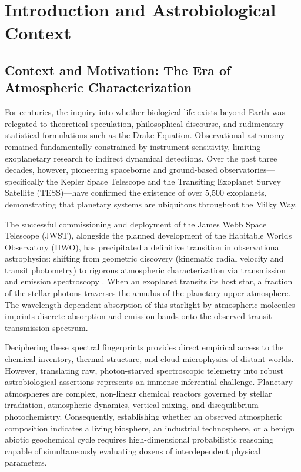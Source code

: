 \chapter{Introduction and Astrobiological Context}\label{chap:introduction}

\section{Context and Motivation: The Era of Atmospheric Characterization}\label{sec:context_motivation}

For centuries, the inquiry into whether biological life exists beyond Earth was relegated to theoretical speculation, philosophical discourse, and rudimentary statistical formulations such as the Drake Equation. Observational astronomy remained fundamentally constrained by instrument sensitivity, limiting exoplanetary research to indirect dynamical detections. Over the past three decades, however, pioneering spaceborne and ground-based observatories---specifically the Kepler Space Telescope and the Transiting Exoplanet Survey Satellite (TESS)---have confirmed the existence of over 5,500 exoplanets, demonstrating that planetary systems are ubiquitous throughout the Milky Way.

The successful commissioning and deployment of the James Webb Space Telescope (JWST), alongside the planned development of the Habitable Worlds Observatory (HWO), has precipitated a definitive transition in observational astrophysics: shifting from geometric discovery (kinematic radial velocity and transit photometry) to rigorous atmospheric characterization via transmission and emission spectroscopy \cite{madhusudhan2023}. When an exoplanet transits its host star, a fraction of the stellar photons traverses the annulus of the planetary upper atmosphere. The wavelength-dependent absorption of this starlight by atmospheric molecules imprints discrete absorption and emission bands onto the observed transit transmission spectrum. 

Deciphering these spectral fingerprints provides direct empirical access to the chemical inventory, thermal structure, and cloud microphysics of distant worlds. However, translating raw, photon-starved spectroscopic telemetry into robust astrobiological assertions represents an immense inferential challenge. Planetary atmospheres are complex, non-linear chemical reactors governed by stellar irradiation, atmospheric dynamics, vertical mixing, and disequilibrium photochemistry. Consequently, establishing whether an observed atmospheric composition indicates a living biosphere, an industrial technosphere, or a benign abiotic geochemical cycle requires high-dimensional probabilistic reasoning capable of simultaneously evaluating dozens of interdependent physical parameters.

